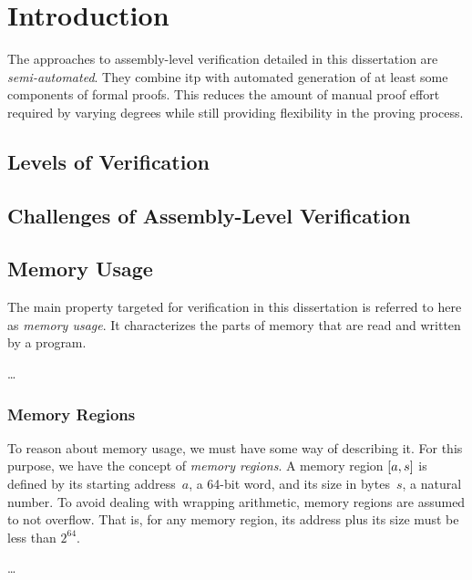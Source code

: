 \chapter{Introduction}

The approaches to assembly-level verification detailed in this dissertation%
are \emph{semi-automated}.
They combine \ac{itp} with automated generation
of at least some components of formal proofs.
This reduces the amount of manual proof effort required by varying degrees
while still providing flexibility in the proving process.


\section{Levels of Verification}  
\section{Challenges of Assembly-Level Verification}

\section{Memory Usage}\label{memory_usage}
The main property targeted for verification in this dissertation
is referred to here as \emph{memory usage}.%
It characterizes the parts of memory that are read and written by a program.


\todo\dots



\subsection{Memory Regions}\label{memory_regions}
To reason about memory usage, we must have some way of describing it.
For this purpose, we have the concept of \emph{memory regions}.%
A memory region $[a,s]$ is defined by its starting address~$a$,
a 64-bit word, and its size in bytes~$s$, a natural number.
To avoid dealing with wrapping arithmetic, memory regions are assumed to not overflow.
That is, for any memory region, its address plus its size must be less than $2^{64}$.



\todo\dots



